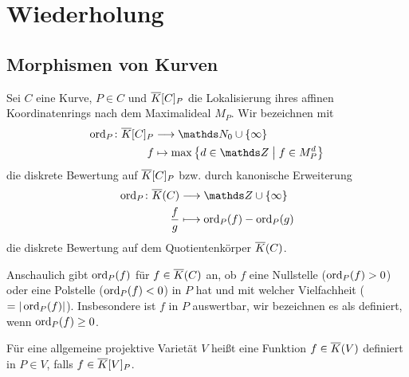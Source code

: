 \section{Wiederholung}
\subsection{Morphismen von Kurven}

\begin{Definition}[Definiertheit]
  Sei $C$ eine Kurve, $P\in C$ und $\overline K[C]_P$ die Lokalisierung
  ihres affinen Koordinatenrings nach dem Maximalideal $M_P$.
  Wir bezeichnen mit
  \begin{align*}
    \ord_P\colon \algK[C]_P &\longto \N_0 \cup \{\infty\} \\
    f &\mapsto \max\left\{d\in\Z\;\middle|\; f\in M_P^d \right\}
  \end{align*}
  die diskrete Bewertung auf $\overline K[C]_P$ bzw. durch kanonische
  Erweiterung
  \begin{align*}
    \ord_P\colon \algK(C) &\longto \Z \cup \{\infty\} \\
    \frac{f}{g} &\longmapsto \ord_P(f) - \ord_P(g)
  \end{align*}
  die diskrete Bewertung auf dem Quotientenkörper $\overline K(C)$.

  Anschaulich gibt $\operatorname{ord}_P(f)$ für $f\in\overline K(C)$ an, ob $f$
  eine Nullstelle ($\operatorname{ord}_P(f)>0$) oder eine Polstelle ($\operatorname{ord}_P(f)<0$)
  in $P$ hat und mit welcher Vielfachheit ($=|\operatorname{ord}_P(f)|$).
  Insbesondere ist $f$ in $P$ auswertbar, wir bezeichnen es als
  definiert, wenn $\operatorname{ord}_P(f)\geq 0$.

  Für eine allgemeine projektive Varietät $V$ heißt eine Funktion
  $f\in\overline K(V)$ definiert in $P\in V$, falls $f\in\overline K[V]_P$.
\end{Definition}

